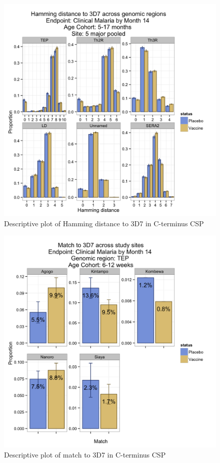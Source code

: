 \documentclass[]{article}
\begin{document}
\begin{figure}[htbp]
\centering
\includegraphics{figures/hamming-infant-c-1.png}
\caption{Descriptive plot of Hamming distance to 3D7 in C-terminus CSP}
\end{figure}

\begin{figure}[htbp]
\centering
\includegraphics{figures/match-newborn-sites-c-1.png}
\caption{Descriptive plot of match to 3D7 in C-terminus CSP}
\end{figure}
\end{document}
